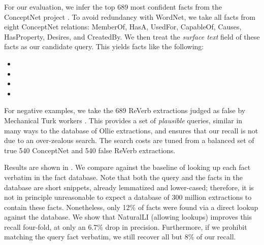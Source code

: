 For our evaluation, we infer the top 689 most confident facts from
  the ConceptNet project \cite{key:2011tandon-conceptnet}.
To avoid redundancy with WordNet, we take all facts from eight
  ConceptNet relations: 
    MemberOf,
    HasA,
    UsedFor,
    CapableOf,
    Causes,
    HasProperty,
    Desires, and 
    CreatedBy.
We then treat the \textit{surface text} field of these facts as our
  candidate query.
This yields facts like the following:

\vspace{-0.25em}
\begin{itemize}
\setlength{\itemsep}{-4pt}
\item[] 
\item[] 
\item[] 
\item[] 
\end{itemize}
\vspace{-0.25em}

For negative examples, we take the 689 ReVerb extractions
  \cite{key:2011fader-reverb}
  judged as false by Mechanical Turk workers \cite{key:2013angeli-truth}.
This provides a set of \textit{plausible} queries, similar in many
  ways to the database of Ollie extractions, and ensures that our
  recall is not due to an over-zealous search.
The search costs are tuned from a balanced set of true 540 ConceptNet and
  540 false ReVerb extractions.

Results are shown in .
We compare against the baseline of looking up each fact verbatim in the
  fact database.
Note that both the query and the facts in the database are 
  short snippets, already lemmatized and lower-cased;
  therefore, it is not in principle unreasonable to
  expect a database of 300 million extractions to contain these facts.
Nonetheless, only 12\% of facts were found via a direct lookup against
  the database.
We show that NaturalLI (allowing lookups) improves this recall
  four-fold, at only an 6.7\% drop in precision.
Furthermore, if we prohibit matching the query fact verbatim,
  we still recover all but 8\% of our recall.



%
%
